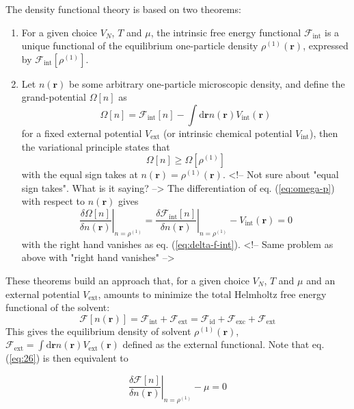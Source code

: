The density functional theory is based on two theorems:
\begin{enumerate}
\item For a given choice $V_{N}$, $T$ and $\mu$, the intrinsic free
energy functional $\mathcal{F}_{\mathrm{int}}$ is a unique functional
of the equilibrium one-particle density $\rho^{(1)}(\mathbf{r})$,
expressed by $\mathcal{F}_{\mathrm{int}}[\rho^{(1)}]$.
\item Let $n(\mathbf{r})$ be some arbitrary one-particle microscopic density,
and define the grand-potential $\Omega[n]$ as
\begin{equation}
\Omega[n]=\mathcal{F}_{\mathrm{int}}[n]-\int\mathrm{d}\mathbf{r}n(\mathbf{r})V_{\mathrm{int}}(\mathbf{r})\label{eq:omega-p}
\end{equation}
for a fixed external potential $V_{\mathrm{ext}}$ (or intrinsic chemical
potential $V_{\mathrm{int}}$), then the variational principle states
that
\begin{equation}
\Omega[n]\geq\Omega[\rho^{(1)}]
\end{equation}
with the equal sign takes at $n(\mathbf{r})=\rho^{(1)}(\mathbf{r})$. <!-- Not sure about "equal sign takes". What is it saying? -->
The differentiation of eq. (\ref{eq:omega-p}) with respect to $n(\mathbf{r})$
gives
\begin{equation}
\left.\frac{\delta\Omega[n]}{\delta n(\mathbf{r})}\right|_{n=\rho^{(1)}}=\left.\frac{\delta\mathcal{F}_{\mathrm{int}}[n]}{\delta n(\mathbf{r})}\right|_{n=\rho^{(1)}}-V_{\mathrm{int}}(\mathbf{r})=0\label{eq:26}
\end{equation}
with the right hand vanishes as eq. (\ref{eq:delta-f-int}). <!-- Same problem as above with "right hand vanishes" -->
\end{enumerate}
These theorems build an approach that, for a given choice $V_{N}$,
$T$ and $\mu$ and an external potential $V_{\mathrm{ext}}$, amounts
to minimize the total Helmholtz free energy functional of the solvent:
\begin{equation}
\mathcal{F}[n(\mathbf{r})]=\mathcal{F}_{\mathrm{int}}+\mathcal{F}_{\mathrm{ext}}=\mathcal{F}_{\mathrm{id}}+\mathcal{F}_{\mathrm{exc}}+\mathcal{F}_{\mathrm{ext}}
\end{equation}
This gives the equilibrium density of solvent $\rho^{(1)}(\mathbf{r})$,
$\mathcal{F}_{\mathrm{ext}}=\int\mathrm{d}\mathbf{r}n(\mathbf{r})V_{\mathrm{ext}}(\mathbf{r})$
defined as the external functional. Note that eq. (\ref{eq:26}) is
then equivalent to

\begin{equation}
\left.\frac{\delta\mathcal{F}[n]}{\delta n(\mathbf{r})}\right|_{n=\rho^{(1)}}-\mu=0
\end{equation}

